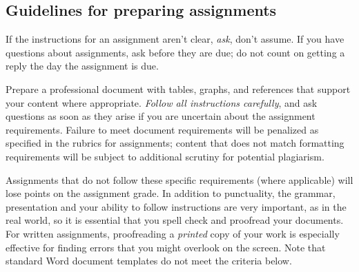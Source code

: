 \documentclass[11pt]{article}
\begin{document}
\subsection{Guidelines for preparing assignments}
If the instructions for an assignment aren't clear, \textit{ask}, don't assume.
If you have questions about assignments, ask before they are due; do not count on getting a reply the day the assignment is due.

Prepare a professional document with tables, graphs, and references that support your content where appropriate.
\textit{Follow all instructions carefully}, and ask questions as soon as they arise if you are uncertain about the assignment requirements.
Failure to meet document requirements will be penalized as specified in the rubrics for assignments; content that does not match formatting requirements will be subject to additional scrutiny for potential plagiarism.

Assignments that do not follow these specific requirements (where applicable) will lose points on the assignment grade.
In addition to punctuality, the grammar, presentation and your ability to follow instructions are very important, as in the real world, so it is essential that you spell check and proofread your documents.
For written assignments, proofreading a \textit{printed} copy of your work is especially effective for finding errors that you might overlook on the screen.
Note that standard Word document templates do not meet the criteria below.
\end{document}
